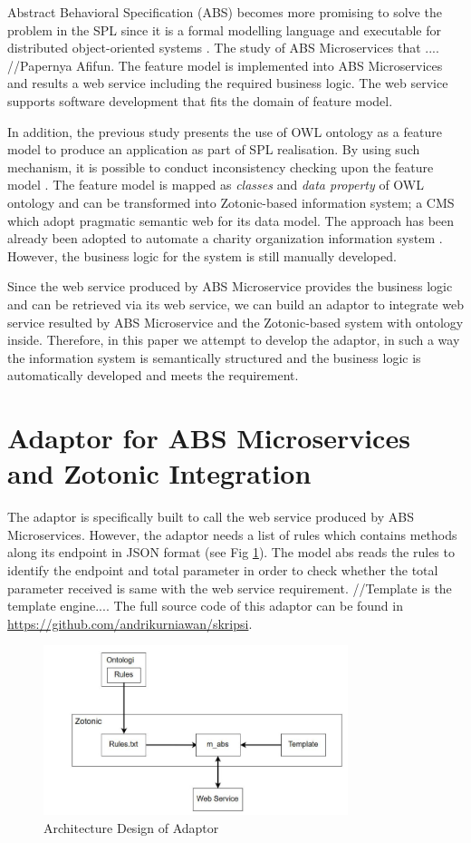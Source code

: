 \documentclass[conference]{IEEEtran}
\begin{document}
Abstract Behavioral Specification (ABS) becomes more promising to solve the problem in the SPL since it is a formal modelling language and executable for distributed object-oriented systems \cite{ABS} \cite{ABSTutorial}. The study of ABS Microservices that .... //Papernya Afifun. The feature model is implemented into ABS Microservices and results a web service including the required business logic. The web service supports software development that fits the domain of feature model.

In addition, the previous study \cite{fmontology} presents the use of OWL ontology as a feature model to produce an application as part of SPL realisation. By using such mechanism, it is possible to conduct inconsistency checking upon the feature model \cite{verify}. The feature model is mapped as \textit{classes} and \textit{data property} of OWL ontology and can be transformed into Zotonic-based information system; a CMS which adopt pragmatic semantic web for its data model. The approach has been already been adopted to automate a charity organization information system \cite{bravyto}. However, the business logic for the system is still manually developed.

Since the web service produced by ABS Microservice provides the business logic and can be retrieved via its web service, we can build an adaptor to integrate web service resulted by ABS Microservice and the Zotonic-based system with ontology inside. Therefore, in this paper we attempt to develop the adaptor, in such a way the information system is semantically structured and the business logic is automatically developed and meets the requirement.

\section{Adaptor for ABS Microservices and Zotonic Integration} 
The adaptor is specifically built to call the web service produced by ABS Microservices. However, the adaptor needs a list of rules which contains methods along its endpoint in JSON format (see Fig \ref{fig_design}). The model abs reads the rules to identify the endpoint and total parameter in order to check whether the total parameter received is same with the web service requirement. //Template is the template engine.... The full source code of this adaptor can be found in \url{https://github.com/andrikurniawan/skripsi}.

\begin{figure}[h]
\centering
\includegraphics[width=3.5in]{adaptordesign}

\caption{Architecture Design of Adaptor}
\label{fig_design}
\end{figure}
\end{document}
